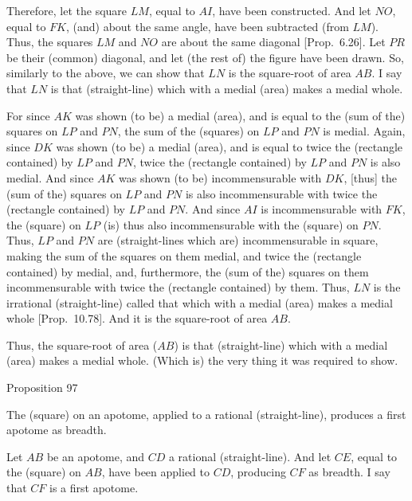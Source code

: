 Therefore, let the square $LM$, equal to $AI$, have been constructed.
And let $NO$, equal to $FK$, (and) about the same angle, have been subtracted (from $LM$). Thus, the squares $LM$ and $NO$ are about the
same diagonal [Prop.~6.26]. 
Let $PR$ be their (common) diagonal, and let (the rest of) the figure have been drawn.
So, similarly to the above, we can show that $LN$ is the square-root of
area $AB$. I say that $LN$ is  that (straight-line) which with a medial (area) makes a medial whole.

For since $AK$ was shown (to be) a medial (area), and is equal to the
(sum of the) squares on $LP$ and $PN$, the sum of the (squares) on
$LP$ and $PN$ is medial. Again, since $DK$ was shown (to
be) a medial (area), and is equal to twice the (rectangle contained)
by $LP$ and $PN$, twice the (rectangle contained) by $LP$ and
$PN$ is also medial. And since $AK$ was shown (to be) incommensurable
with $DK$, [thus] the (sum of the) squares on $LP$ and $PN$ is also
incommensurable with twice the (rectangle contained) by $LP$ and $PN$.
And since $AI$ is incommensurable with $FK$, the (square) on
$LP$ (is) thus also incommensurable with the (square) on $PN$. Thus, $LP$ and $PN$
are (straight-lines which are) incommensurable in square, making the sum of the squares on them
medial, and twice the (rectangle contained) by  medial, and, furthermore,
the (sum of the) squares on them incommensurable with twice the
(rectangle contained) by them. Thus, $LN$ is the irrational (straight-line) called  that  which with a medial (area) makes a medial whole [Prop.~10.78]. And it is the square-root of area $AB$.

Thus, the square-root of area ($AB$) is that (straight-line) which with a medial (area) makes a medial whole. (Which is) the very thing it was required to show.


\begin{center}
{\large Proposition 97}
\end{center}

The (square) on an apotome, applied
to a rational (straight-line), produces  a first apotome as breadth.

\epsfysize=1.6in
\centerline{}

Let $AB$ be an apotome, and $CD$ a rational (straight-line). And
let $CE$, equal to the (square) on $AB$, have been applied to
$CD$, producing $CF$ as breadth. I say that $CF$ is a first apotome.

